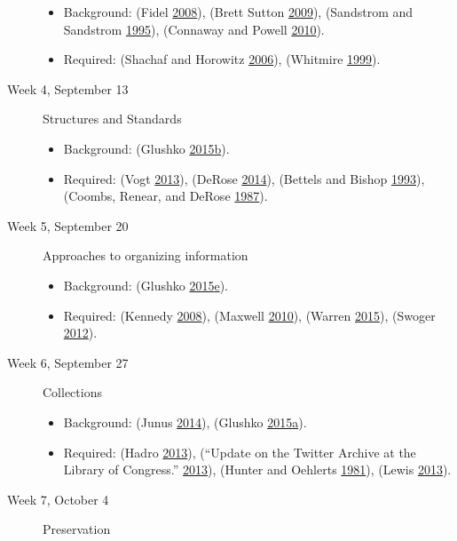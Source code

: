 \documentclass[]{article}
\providecommand{\tightlist}{%
  \setlength{\itemsep}{0pt}\setlength{\parskip}{0pt}}
\begin{document}
\begin{description}
\begin{itemize}
\tightlist
\item
  Background: (Fidel
  \protect\hyperlink{ref-fidelux5fareux5f2008}{2008}), (Brett Sutton
  \protect\hyperlink{ref-brettux5fsuttonux5fqualitativeux5f2009}{2009}),
  (Sandstrom and Sandstrom
  \protect\hyperlink{ref-sandstromux5fuseux5f1995}{1995}), (Connaway and
  Powell \protect\hyperlink{ref-connawayux5fselectingux5f2010}{2010}).
\item
  Required: (Shachaf and Horowitz
  \protect\hyperlink{ref-shachafux5fareux5f2006}{2006}), (Whitmire
  \protect\hyperlink{ref-whitmireux5fracialux5f1999}{1999}).
\end{itemize}
\item[Week 4, September 13]
Structures and Standards

\begin{itemize}
\tightlist
\item
  Background: (Glushko
  \protect\hyperlink{ref-glushkoux5fdescribingux5f2015}{2015}\protect\hyperlink{ref-glushkoux5fdescribingux5f2015}{b}).
\item
  Required: (Vogt
  \protect\hyperlink{ref-vogtux5fescienceux5f2013}{2013}), (DeRose
  \protect\hyperlink{ref-deroseux5fwhatux5f2014}{2014}), (Bettels and
  Bishop \protect\hyperlink{ref-bettelsux5funicode:ux5f1993}{1993}),
  (Coombs, Renear, and DeRose
  \protect\hyperlink{ref-coombsux5fmarkupux5f1987}{1987}).
\end{itemize}
\item[Week 5, September 20]
Approaches to organizing information

\begin{itemize}
\tightlist
\item
  Background: (Glushko
  \protect\hyperlink{ref-glushkoux5fresourcesux5f2015}{2015}\protect\hyperlink{ref-glushkoux5fresourcesux5f2015}{e}).
\item
  Required: (Kennedy
  \protect\hyperlink{ref-kennedyux5fnineux5f2008}{2008}), (Maxwell
  \protect\hyperlink{ref-maxwellux5fbibliographicux5f2010}{2010}),
  (Warren \protect\hyperlink{ref-warrenux5f2015ux5f2015}{2015}), (Swoger
  \protect\hyperlink{ref-swogerux5f.ux5f2012}{2012}).
\end{itemize}
\item[Week 6, September 27]
Collections

\begin{itemize}
\tightlist
\item
  Background: (Junus
  \protect\hyperlink{ref-junusux5fdigitalux5f2014}{2014}), (Glushko
  \protect\hyperlink{ref-glushkoux5factivitiesux5f2015}{2015}\protect\hyperlink{ref-glushkoux5factivitiesux5f2015}{a}).
\item
  Required: (Hadro
  \protect\hyperlink{ref-hadroux5fwhatsux5f2013}{2013}), (``Update on
  the Twitter Archive at the Library of Congress.''
  \protect\hyperlink{ref-ux5fupdateux5f2013}{2013}), (Hunter and
  Oehlerts \protect\hyperlink{ref-hunterux5ftwoux5f1981}{1981}), (Lewis
  \protect\hyperlink{ref-lewisux5fstacksux5f2013}{2013}).
\end{itemize}
\item[Week 7, October 4]
Preservation


\end{description}
\end{document}
